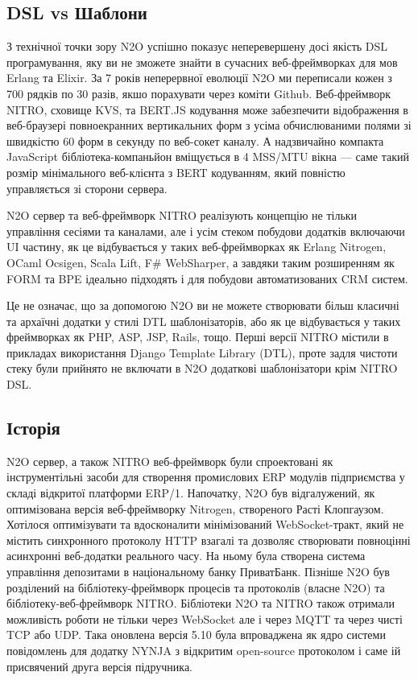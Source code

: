 \subsection{DSL vs Шаблони}

З технічної точки зору N2O успішно показує неперевершену досі якість
DSL програмування, яку ви не зможете знайти в сучасних веб-фреймворках
для мов Erlang та Elixir. За 7 років неперервної еволюції N2O ми переписали
кожен з 700 рядків по 30 разів, якшо порахувати через коміти Github.
Веб-фреймворк NITRO, сховище KVS, та BERT.JS кодування може забезпечити
відображення в веб-браузері повноекранних вертикальних форм з усіма
обчислюваними полями зі швидкістю 60 форм в секунду по веб-сокет каналу.
А надзвичайно компакта JavaScript бібліотека-компаньйон вміщується
в 4 MSS/MTU вікна — саме такий розмір мінімального веб-клієнта з BERT
кодуванням, який повністю управляється зі сторони сервера.

N2O сервер та веб-фреймворк NITRO реалізують концепцію не тільки
управління сесіями та каналами, але і усім стеком побудови додатків
включаючи UI частину, як це відбувається у таких веб-фреймворках як
Erlang Nitrogen, OCaml Ocsigen, Scala Lift, F\# WebSharper, а завдяки
таким розширенням як FORM та BPE ідеально підходять і для побудови
автоматизованих CRM систем.

Це не означає, що за допомогою N2O ви не можете створювати більш
класичні та архаїчні додатки у стилі DTL шаблонізаторів, або як це
відбувається у таких фреймворках як PHP, ASP, JSP, Rails, тощо.
Перші версії NITRO містили в прикладах використання Django Template
Library (DTL), проте задля чистоти стеку були прийнято не включати
в N2O додаткові шаблонізатори крім NITRO DSL.

\subsection{Історія}

N2O сервер, а також NITRO веб-фреймворк були спроектовані як інструментільні засоби
для створення промислових ERP модулів підприємства у складі відкритої платформи ERP/1.
Напочатку, N2O був відгалужений, як оптимізована версія веб-фреймворку Nitrogen,
створеного Расті Клопгаузом. Хотілося оптимізувати та вдосконалити мінімізований
WebSocket-тракт, який не містить синхронного протоколу HTTP взагалі та дозволяє
створювати повноцінні асинхронні веб-додатки реального часу. На ньому була створена
система управління депозитами в національному банку ПриватБанк. Пізніше N2O був розділений
на бібліотеку-фреймворк процесів та протоколів (власне N2O) та бібліотеку-веб-фреймворк NITRO.
Бібліотеки N2O та NITRO також отримали можливість роботи не тільки через WebSocket але і
через MQTT та через чисті TCP або UDP. Така оновлена версія 5.10 була впроваджена як ядро
системи повідомлень для додатку NYNJA з відкритим open-source протоколом і саме ій
присвячений друга версія підручника.

